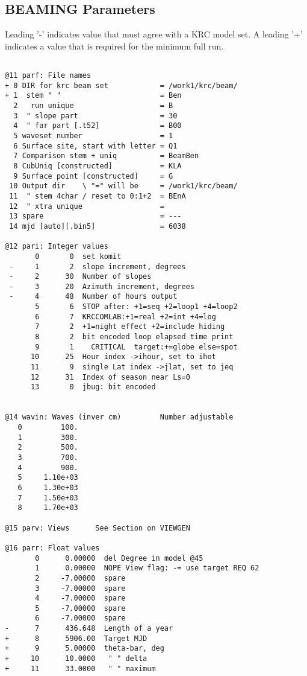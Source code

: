 \documentclass{article}
\begin{document}
\subsection{ BEAMING Parameters}
Leading '-' indicates value that must agree with a KRC model set. A leading '+' indicates a value that is required for the minimum full run.
\vspace{-3.mm} 
\begin{verbatim}

@11 parf: File names
+ 0 DIR for krc beam set            = /work1/krc/beam/
+ 1  stem " "                       = Ben
  2   run unique                    = B
  3  " slope part                   = 30
  4  " far part [.t52]              = B00
  5 waveset number                  = 1
  6 Surface site, start with letter = Q1
  7 Comparison stem + uniq          = BeamBen
  8 CubUniq [constructed]           = KLA
  9 Surface point [constructed]     = G
 10 Output dir    \ "=" will be     = /work1/krc/beam/
 11  " stem 4char / reset to 0:1+2  = BEnA
 12  " xtra unique                  = 
 13 spare                           = ---
 14 mjd [auto][.bin5]               = 6038

@12 pari: Integer values
       0       0  set komit
 -     1       2  slope increment, degrees
 -     2      30  Number of slopes
 -     3      20  Azimuth increment, degrees
 -     4      48  Number of hours output
       5       6  STOP after: +1=seq +2=loop1 +4=loop2
       6       7  KRCCOMLAB:+1=real +2=int +4=log
       7       2  +1=night effect +2=include hiding
       8       2  bit encoded loop elapsed time print
       9       1    CRITICAL  target:+=globe else=spot
      10      25  Hour index ->ihour, set to ihot
      11       9  single Lat index ->jlat, set to jeq
      12      31  Index of season near Ls=0
      13       0  jbug: bit encoded


@14 wavin: Waves (inver cm)         Number adjustable
   0         100.
   1         300.
   2         500.
   3         700.
   4         900.
   5     1.10e+03
   6     1.30e+03
   7     1.50e+03
   8     1.70e+03

@15 parv: Views      See Section on VIEWGEN 

@16 parr: Float values
       0      0.00000  del Degree in model @45
       1      0.00000  NOPE View flag: -= use target REQ 62
       2     -7.00000  spare
       3     -7.00000  spare
       4     -7.00000  spare
       5     -7.00000  spare
       6     -7.00000  spare
-      7      436.648  Length of a year
+      8      5906.00  Target MJD
+      9      5.00000  theta-bar, deg
+     10      10.0000   " " delta
+     11      33.0000   " " maximum
\end{verbatim} 
\end{document}
